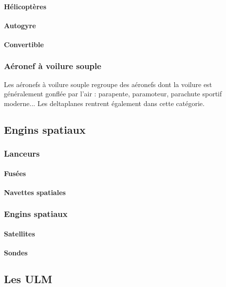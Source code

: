 		\paragraph{Hélicoptères}
		\paragraph{Autogyre}
		\paragraph{Convertible}
		
	\subsubsection{Aéronef à voilure souple}
	Les aéronefs à voilure souple  regroupe des aéronefs dont la voilure est généralement gonflée par l'air : parapente, paramoteur, parachute sportif moderne... Les deltaplanes rentrent également dans cette catégorie.
	
\subsection{Engins spatiaux}
	\subsubsection{Lanceurs}
		\paragraph{Fusées}
		\paragraph{Navettes spatiales}
		
	\subsubsection{Engins spatiaux}
		\paragraph{Satellites}
		\paragraph{Sondes}
		
\subsection{Les ULM}


